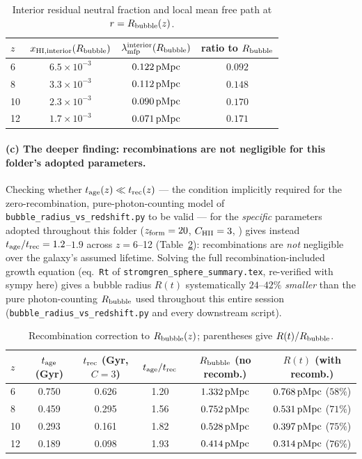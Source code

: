 \documentclass[11pt,a4paper]{article}
\newcommand{\pMpc}{\,{\rm pMpc}}
\newcommand{\lmfp}{\lambda_{\rm mfp}}
\begin{document}
\begin{table}[h]
\centering\small
\begin{tabular}{@{}lccc@{}}
\toprule
$z$ & $x_{\rm HI,interior}(R_{\rm bubble})$ & $\lmfp^{\rm interior}(R_{\rm bubble})$ & ratio to $R_{\rm bubble}$\\
\midrule
6  & $6.5\times10^{-3}$ & $0.122\pMpc$ & $0.092$ \\
8  & $3.3\times10^{-3}$ & $0.112\pMpc$ & $0.148$ \\
10 & $2.3\times10^{-3}$ & $0.090\pMpc$ & $0.170$ \\
12 & $1.7\times10^{-3}$ & $0.071\pMpc$ & $0.171$ \\
\bottomrule
\end{tabular}
\caption{Interior residual neutral fraction and local mean free path at $r=R_{\rm bubble}(z)$.}
\label{tab:interior}
\end{table}

\paragraph{(c) The deeper finding: recombinations are not negligible for this folder's adopted parameters.}
Checking whether $t_{\rm age}(z)\ll t_{\rm rec}(z)$ --- the condition implicitly required for the
zero-recombination, pure-photon-counting model of \texttt{bubble\_radius\_vs\_redshift.py} to be valid ---
for the \emph{specific} parameters adopted throughout this folder ($z_{\rm form}=20$,
$C_{\rm HII}=3$, \citealt{Robertson2015}) gives instead $t_{\rm age}/t_{\rm rec}=1.2$--$1.9$ across
$z=6$--12 (Table~\ref{tab:recomb}): recombinations are \emph{not} negligible over the galaxy's assumed
lifetime. Solving the full recombination-included growth equation (eq.~\texttt{Rt} of
\texttt{stromgren\_sphere\_summary.tex}, re-verified with sympy here) gives a bubble radius $R(t)$
systematically $24$--$42\%$ \emph{smaller} than the pure photon-counting $R_{\rm bubble}$ used throughout
this entire session (\texttt{bubble\_radius\_vs\_redshift.py} and every downstream script).

\begin{table}[h]
\centering\small
\begin{tabular}{@{}lccccc@{}}
\toprule
$z$ & $t_{\rm age}$ (Gyr) & $t_{\rm rec}$ (Gyr, $C{=}3$) & $t_{\rm age}/t_{\rm rec}$ & $R_{\rm bubble}$ (no recomb.) & $R(t)$ (with recomb.) \\
\midrule
6  & 0.750 & 0.626 & 1.20 & $1.332\pMpc$ & $0.768\pMpc$ ($58\%$) \\
8  & 0.459 & 0.295 & 1.56 & $0.752\pMpc$ & $0.531\pMpc$ ($71\%$) \\
10 & 0.293 & 0.161 & 1.82 & $0.528\pMpc$ & $0.397\pMpc$ ($75\%$) \\
12 & 0.189 & 0.098 & 1.93 & $0.414\pMpc$ & $0.314\pMpc$ ($76\%$) \\
\bottomrule
\end{tabular}
\caption{Recombination correction to $R_{\rm bubble}(z)$; parentheses give $R(t)/R_{\rm bubble}$.}
\label{tab:recomb}
\end{table}
\end{document}
